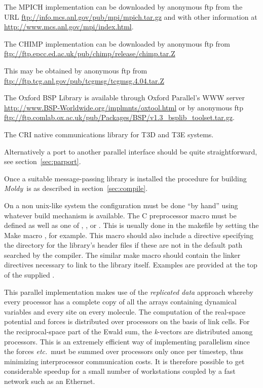 \documentclass[a4paper,twoside]{report}
\newcommand{\moldy}{\emph{Moldy}}
\newcommand{\etc}{\emph{etc.}}
\begin{document}
\begin{description}
\raggedright
\item[MPI] The MPICH implementation can be downloaded by anonymous ftp
  from the URL \url{ftp://info.mcs.anl.gov/pub/mpi/mpich.tar.gz} and
  with other information at \url{http://www.mcs.anl.gov/mpi/index.html}.
  
  The CHIMP implementation can be downloaded by anonymous ftp from
  \url{ftp://ftp.epcc.ed.ac.uk/pub/chimp/release/chimp.tar.Z}
\item[TCGMSG] This may be obtained by anonymous ftp from
  \url{ftp://ftp.tcg.anl.gov/pub/tcgmsg/tcgmsg.4.04.tar.Z}
\item[BSP] The Oxford BSP Library is available through Oxford
  Parallel's WWW server
  \url{http://www.BSP-Worldwide.org/implmnts/oxtool.html} or by
  anonymous ftp
  \url{ftp://ftp.comlab.ox.ac.uk/pub/Packages/BSP/v1.3_bsplib_toolset.tar.gz}.
\item[SHMEM] The CRI native communications library for T3D and T3E
  systems.
\end{description}

\noindent
Alternatively a port to another parallel interface should be quite
straightforward, see section~\ref{sec:parport}.

Once a suitable message-passing library is installed the procedure for
building \moldy\ is as described in section~\ref{sec:compile}. 

On a non unix-like system the configuration must be done ``by hand''
using whatever build mechanism is available.  The C preprocessor macro
 must be defined as well as one of , ,
 or . This is usually done in the makefile by
setting the Make macro , for example.  This
macro should also include a  directive specifying the
directory for the library's header files if these are not in the
default path searched by the compiler.  The similar make macro
 should contain the linker directives necessary to link
to the library itself. Examples are provided at the top of the
supplied .

This parallel implementation makes use of the \emph{replicated data}
approach\cite{smith:91} whereby every processor has a complete copy of
all the arrays containing dynamical variables and every site on every
molecule.  The computation of the real-space potential and forces is
distributed over processors on the basis of link cells.  For the
reciprocal-space part of the Ewald sum, the \emph{k}-vectors are
distributed among processors.  This is an extremely efficient way of
implementing parallelism since the forces \etc\ must be summed over
processors only once per timestep, thus minimizing interprocessor
communication costs.  It is therefore possible to get considerable
speedup for a small number of workstations coupled by a fast network
such as an Ethernet.
\end{document}
